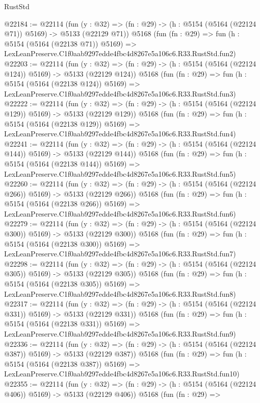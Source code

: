 \begin{lexlean}{RustStd}
\begin{coremodule}
@22184 := @22114
    (fun (y : @32) => (fn : @29) -> (h : @5154 (@5164 (@22124 @71)) @5169) -> @5133 (@22129 @71))
    @5168
    (fun (fn : @29) =>
    fun (h : @5154 (@5164 (@22138 @71)) @5169) =>
    LexLeanPreserve.C1f0aab9297edde4fbc4d8267e5a106c6.R33.RustStd.fun2)
@22203 := @22114
    (fun (y : @32) => (fn : @29) -> (h : @5154 (@5164 (@22124 @124)) @5169) -> @5133 (@22129 @124))
    @5168
    (fun (fn : @29) =>
    fun (h : @5154 (@5164 (@22138 @124)) @5169) =>
    LexLeanPreserve.C1f0aab9297edde4fbc4d8267e5a106c6.R33.RustStd.fun3)
@22222 := @22114
    (fun (y : @32) => (fn : @29) -> (h : @5154 (@5164 (@22124 @129)) @5169) -> @5133 (@22129 @129))
    @5168
    (fun (fn : @29) =>
    fun (h : @5154 (@5164 (@22138 @129)) @5169) =>
    LexLeanPreserve.C1f0aab9297edde4fbc4d8267e5a106c6.R33.RustStd.fun4)
@22241 := @22114
    (fun (y : @32) => (fn : @29) -> (h : @5154 (@5164 (@22124 @144)) @5169) -> @5133 (@22129 @144))
    @5168
    (fun (fn : @29) =>
    fun (h : @5154 (@5164 (@22138 @144)) @5169) =>
    LexLeanPreserve.C1f0aab9297edde4fbc4d8267e5a106c6.R33.RustStd.fun5)
@22260 := @22114
    (fun (y : @32) => (fn : @29) -> (h : @5154 (@5164 (@22124 @266)) @5169) -> @5133 (@22129 @266))
    @5168
    (fun (fn : @29) =>
    fun (h : @5154 (@5164 (@22138 @266)) @5169) =>
    LexLeanPreserve.C1f0aab9297edde4fbc4d8267e5a106c6.R33.RustStd.fun6)
@22279 := @22114
    (fun (y : @32) => (fn : @29) -> (h : @5154 (@5164 (@22124 @300)) @5169) -> @5133 (@22129 @300))
    @5168
    (fun (fn : @29) =>
    fun (h : @5154 (@5164 (@22138 @300)) @5169) =>
    LexLeanPreserve.C1f0aab9297edde4fbc4d8267e5a106c6.R33.RustStd.fun7)
@22298 := @22114
    (fun (y : @32) => (fn : @29) -> (h : @5154 (@5164 (@22124 @305)) @5169) -> @5133 (@22129 @305))
    @5168
    (fun (fn : @29) =>
    fun (h : @5154 (@5164 (@22138 @305)) @5169) =>
    LexLeanPreserve.C1f0aab9297edde4fbc4d8267e5a106c6.R33.RustStd.fun8)
@22317 := @22114
    (fun (y : @32) => (fn : @29) -> (h : @5154 (@5164 (@22124 @331)) @5169) -> @5133 (@22129 @331))
    @5168
    (fun (fn : @29) =>
    fun (h : @5154 (@5164 (@22138 @331)) @5169) =>
    LexLeanPreserve.C1f0aab9297edde4fbc4d8267e5a106c6.R33.RustStd.fun9)
@22336 := @22114
    (fun (y : @32) => (fn : @29) -> (h : @5154 (@5164 (@22124 @387)) @5169) -> @5133 (@22129 @387))
    @5168
    (fun (fn : @29) =>
    fun (h : @5154 (@5164 (@22138 @387)) @5169) =>
    LexLeanPreserve.C1f0aab9297edde4fbc4d8267e5a106c6.R33.RustStd.fun10)
@22355 := @22114
    (fun (y : @32) => (fn : @29) -> (h : @5154 (@5164 (@22124 @406)) @5169) -> @5133 (@22129 @406))
    @5168
    (fun (fn : @29) =>

\end{coremodule}
\end{lexlean}
